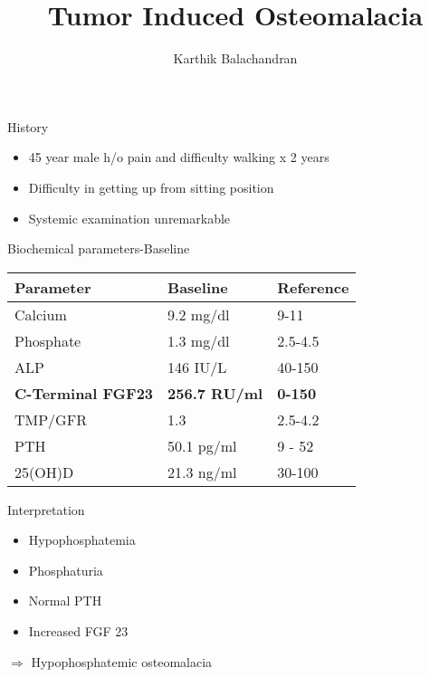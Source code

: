 \documentclass[english]{beamer} %
\begin{document}
\title[TIO]{Tumor Induced Osteomalacia}

\author{Karthik Balachandran}
\date{}

\begin{frame}
  \titlepage
  \vspace{-30pt}
\end{frame}



\begin{frame}[<+->]{History}
\begin{itemize}
	\item 45 year male h/o pain and difficulty walking x 2 years
	\item Difficulty in getting up from sitting position
	\item Systemic examination unremarkable
\end{itemize}
\end{frame}
\begin{frame}{Biochemical parameters-Baseline}
\begin{center}
		\begin{tabular}{p{4cm}p{3.5cm}l}
			\toprule
			Parameter                 & Baseline             & Reference      \\ \midrule
			Calcium                   & 9.2 mg/dl            & 9-11           \\
			Phosphate                 & 1.3 mg/dl            & 2.5-4.5        \\
			ALP                       & 146 IU/L             & 40-150         \\
			\textbf{C-Terminal FGF23} & \textbf{256.7 RU/ml} & \textbf{0-150} \\
			TMP/GFR                   & 1.3                  & 2.5-4.2        \\
			PTH                       & 50.1 pg/ml           & 9 - 52         \\
			25(OH)D                   & 21.3 ng/ml           & 30-100 \\ \bottomrule
		\end{tabular} 
\end{center}
\end{frame}
\begin{frame}[<+->]{Interpretation}
	\begin{itemize}
		\item Hypophosphatemia
		\item Phosphaturia
		\item Normal PTH
		\item Increased FGF 23	
	\end{itemize}  \pause
	\bigskip
	$ \Longrightarrow $ Hypophosphatemic osteomalacia
\end{frame}
\end{document}
